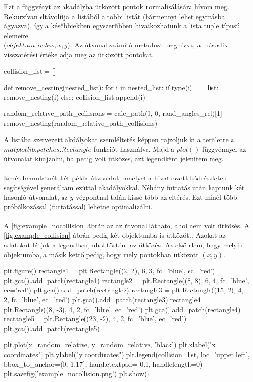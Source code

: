 Ezt a függvényt az akadályba ütközött pontok normalizálására hívom meg. Rekurzívan eltávolítja a listából a többi listát (bármennyi lehet egymásba ágyazva), így a későbbiekben egyszerűbben hivatkozhatunk a lista tuple típusú elemeire\\
($objektum\_index, x, y$). Az útvonal számító metódust meghívva, a második visszatérési értéke adja meg az ütközött pontokat.

\begin{python}
collision_list = []

def remove_nesting(nested_list):
    for i in nested_list:
        if type(i) == list:
            remove_nesting(i)
        else:
            collision_list.append(i)
            
random_relative_path_collisions = calc_path(0, 0, rand_angles_rel)[1]            
remove_nesting(random_relative_path_collisions)
\end{python}

A listába szervezett akdályokat szemléltetés képpen rajzoljuk ki a területre a \\
$ matplotlib.patches.Rectangle $ funkciót használva. Majd a $ plot() $ függvénnyel az útvonalat kirajzolni, ha pedig volt ütközés, azt legendként jelenítem meg.\\\\
Ismét bemutatnék két példa útvonalat, amelyet a hivatkozott kódrészletek segítségével generáltam ezúttal akadályokkal. Néhány futtatás után kaptunk két hasonló útvonalat, az $ y $ végpontnál talán kissé több az eltérés. Ezt minél több próbálkozással (futtatással) lehetne optimalizálni. \\\\
A \ref{fig:example_nocollision} ábrán az az útvonal látható, ahol nem volt ütközés. A \ref{fig:example_collision} ábrán pedig két objektumba is ütközött. Azokat az adatokat látjuk a legendben, ahol történt az ütközés. Az első elem, hogy melyik objektumba, a másik kettő pedig, hogy mely pontokban ütközött $ (x, y) $.

\begin{python}
plt.figure()
rectangle1 = plt.Rectangle((2, 2), 6, 3, fc='blue', ec='red')
plt.gca().add_patch(rectangle1)
rectangle2 = plt.Rectangle((8, 8), 6, 4, fc='blue', ec='red')
plt.gca().add_patch(rectangle2)
rectangle3 = plt.Rectangle((15, 2), 4, 2, fc='blue', ec='red')
plt.gca().add_patch(rectangle3)
rectangle4 = plt.Rectangle((8, -3), 4, 2, fc='blue', ec='red')
plt.gca().add_patch(rectangle4)
rectangle5 = plt.Rectangle((23, -2), 4, 2, fc='blue', ec='red')
plt.gca().add_patch(rectangle5)

plt.plot(x_random_relative, y_random_relative, 'black')
plt.xlabel("x coordinates")
plt.ylabel("y coordinates")
plt.legend(collision_list, loc='upper left', bbox_to_anchor=(0, 1.17),
handletextpad=-0.1, handlelength=0)
plt.savefig('example_nocollision.png')
plt.show()
\end{python}


